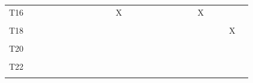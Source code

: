 \documentclass[
]{article}
\begin{document}
\begin{longtable}[l]{lllllllllllllllllllllllll}
\addlinespace
T16 &  &  &  &  &  &  &  &  &  &  & X &  &  &  &  &  &  &  &  & X &  &  &  & \\
\cellcolor{gray!6}{T17} & \cellcolor{gray!6}{} & \cellcolor{gray!6}{} & \cellcolor{gray!6}{} & \cellcolor{gray!6}{} & \cellcolor{gray!6}{} & \cellcolor{gray!6}{} & \cellcolor{gray!6}{} & \cellcolor{gray!6}{} & \cellcolor{gray!6}{} & \cellcolor{gray!6}{} & \cellcolor{gray!6}{} & \cellcolor{gray!6}{} & \cellcolor{gray!6}{} & \cellcolor{gray!6}{} & \cellcolor{gray!6}{} & \cellcolor{gray!6}{} & \cellcolor{gray!6}{} & \cellcolor{gray!6}{} & \cellcolor{gray!6}{} & \cellcolor{gray!6}{} & \cellcolor{gray!6}{X} & \cellcolor{gray!6}{X} & \cellcolor{gray!6}{} & \cellcolor{gray!6}{}\\
T18 &  &  &  &  &  &  &  &  &  &  &  &  &  &  &  &  &  &  &  &  &  &  & X & \\
\cellcolor{gray!6}{T19} & \cellcolor{gray!6}{} & \cellcolor{gray!6}{} & \cellcolor{gray!6}{} & \cellcolor{gray!6}{} & \cellcolor{gray!6}{} & \cellcolor{gray!6}{} & \cellcolor{gray!6}{} & \cellcolor{gray!6}{} & \cellcolor{gray!6}{} & \cellcolor{gray!6}{} & \cellcolor{gray!6}{} & \cellcolor{gray!6}{} & \cellcolor{gray!6}{} & \cellcolor{gray!6}{} & \cellcolor{gray!6}{} & \cellcolor{gray!6}{} & \cellcolor{gray!6}{} & \cellcolor{gray!6}{} & \cellcolor{gray!6}{} & \cellcolor{gray!6}{} & \cellcolor{gray!6}{} & \cellcolor{gray!6}{} & \cellcolor{gray!6}{} & \cellcolor{gray!6}{X}\\
T20 &  &  &  &  &  &  &  &  &  &  &  &  &  &  &  &  &  &  &  &  &  &  &  & \\
\addlinespace
\cellcolor{gray!6}{T21} & \cellcolor{gray!6}{} & \cellcolor{gray!6}{} & \cellcolor{gray!6}{} & \cellcolor{gray!6}{} & \cellcolor{gray!6}{} & \cellcolor{gray!6}{} & \cellcolor{gray!6}{} & \cellcolor{gray!6}{} & \cellcolor{gray!6}{} & \cellcolor{gray!6}{} & \cellcolor{gray!6}{} & \cellcolor{gray!6}{} & \cellcolor{gray!6}{} & \cellcolor{gray!6}{} & \cellcolor{gray!6}{} & \cellcolor{gray!6}{} & \cellcolor{gray!6}{} & \cellcolor{gray!6}{} & \cellcolor{gray!6}{} & \cellcolor{gray!6}{} & \cellcolor{gray!6}{} & \cellcolor{gray!6}{} & \cellcolor{gray!6}{} & \cellcolor{gray!6}{}\\
T22 &  &  &  &  &  &  &  &  &  &  &  &  &  &  &  &  &  &  &  &  &  &  &  & \\
\cellcolor{gray!6}{T23} & \cellcolor{gray!6}{} & \cellcolor{gray!6}{} & \cellcolor{gray!6}{} & \cellcolor{gray!6}{} & \cellcolor{gray!6}{} & \cellcolor{gray!6}{} & \cellcolor{gray!6}{} & \cellcolor{gray!6}{} & \cellcolor{gray!6}{} & \cellcolor{gray!6}{} & \cellcolor{gray!6}{} & \cellcolor{gray!6}{} & \cellcolor{gray!6}{} & \cellcolor{gray!6}{} & \cellcolor{gray!6}{} & \cellcolor{gray!6}{} & \cellcolor{gray!6}{} & \cellcolor{gray!6}{} & \cellcolor{gray!6}{} & \cellcolor{gray!6}{} & \cellcolor{gray!6}{} & \cellcolor{gray!6}{} & \cellcolor{gray!6}{} & \cellcolor{gray!6}{}\\

\end{longtable}
\end{document}
